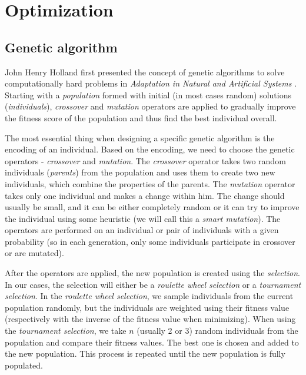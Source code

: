 \chapter{Optimization}

\section{Genetic algorithm}

John Henry Holland first presented the concept of genetic algorithms to solve computationally hard problems in \textit{Adaptation in Natural and Artificial Systems} \cite{Holland:1975}. Starting with a \textit{population} formed with initial (in most cases random) solutions (\textit{individuals}), \textit{crossover} and \textit{mutation} operators are applied to gradually improve the fitness score of the population and thus find the best individual overall.

The most essential thing when designing a specific genetic algorithm is the encoding of an individual. Based on the encoding, we need to choose the genetic operators - \textit{crossover} and \textit{mutation}. The \textit{crossover} operator takes two random individuals (\textit{parents}) from the population and uses them to create two new individuals, which combine the properties of the parents. The \textit{mutation} operator takes only one individual and makes a change within him. The change should usually be small, and it can be either completely random or it can try to improve the individual using some heuristic (we will call this a \textit{smart mutation}). The operators are performed on an individual or pair of individuals with a given probability (so in each generation, only some individuals participate in crossover or are mutated).

After the operators are applied, the new population is created using the \textit{selection}. In our cases, the selection will either be a \textit{roulette wheel selection} or a \textit{tournament selection}. In the \textit{roulette wheel selection}, we sample individuals from the current population randomly, but the individuals are weighted using their fitness value (respectively with the inverse of the fitness value when minimizing). When using the \textit{tournament selection}, we take $n$ (usually 2 or 3) random individuals from the population and compare their fitness values. The best one is chosen and added to the new population. This process is repeated until the new population is fully populated.

